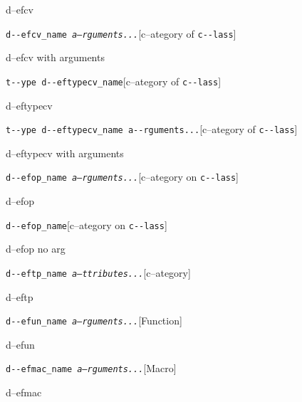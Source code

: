 \documentclass{book}
\begin{document}
\begin{titlepage}
%
d--efcv

\noindent\texttt{d{-}{-}efcv\_name \EmbracOn{}\textnormal{\textsl{a--rguments...}}\EmbracOff{}}\hfill[c--ategory of \texttt{c{-}{-}lass}]



%
d--efcv with arguments

\noindent\texttt{t{-}{-}ype d{-}{-}eftypecv\_name}\hfill[c--ategory of \texttt{c{-}{-}lass}]



%
d--eftypecv

\noindent\texttt{t{-}{-}ype d{-}{-}eftypecv\_name a{-}{-}rguments...}\hfill[c--ategory of \texttt{c{-}{-}lass}]



%
d--eftypecv with arguments

\noindent\texttt{d{-}{-}efop\_name \EmbracOn{}\textnormal{\textsl{a--rguments...}}\EmbracOff{}}\hfill[c--ategory on \texttt{c{-}{-}lass}]



%
d--efop

\noindent\texttt{d{-}{-}efop\_name}\hfill[c--ategory on \texttt{c{-}{-}lass}]



%
d--efop no arg

\noindent\texttt{d{-}{-}eftp\_name \EmbracOn{}\textnormal{\textsl{a--ttributes...}}\EmbracOff{}}\hfill[c--ategory]



%
d--eftp

\noindent\texttt{d{-}{-}efun\_name \EmbracOn{}\textnormal{\textsl{a--rguments...}}\EmbracOff{}}\hfill[Function]



%
d--efun

\noindent\texttt{d{-}{-}efmac\_name \EmbracOn{}\textnormal{\textsl{a--rguments...}}\EmbracOff{}}\hfill[Macro]



%
d--efmac


\end{titlepage}
\end{document}
